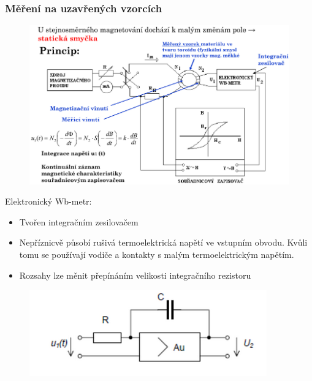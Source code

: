 \subsubsection{Měření na uzavřených vzorcích}
\begin{figure}[h!]
    \centering
    \includegraphics[scale = 0.5]{images/MerUzavVzor.png}
\end{figure}
Elektronický Wb-metr:
\begin{itemize}
    \item Tvořen integračním zesilovačem
    \item Nepříznicvě působí rušivá termoelektrická napětí ve vstupním obvodu. Kvůli tomu se používají vodiče a kontakty s malým termoelektrickým napětím.
    \item Rozsahy lze měnit přepínáním velikosti integračního rezistoru
\end{itemize}
\begin{figure}
    \centering
    \includegraphics[scale = 0.9]{images/Wb-metr.png}
\end{figure}

